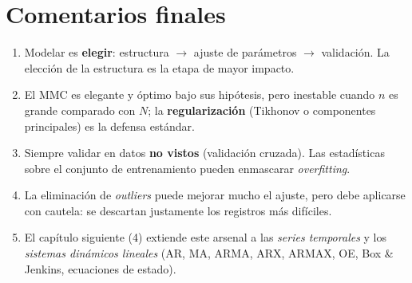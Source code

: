 \section{Comentarios finales}

\begin{enumerate}[leftmargin=1.2cm]
  \item Modelar es \textbf{elegir}: estructura $\rightarrow$ ajuste de
        parámetros $\rightarrow$ validación. La elección de la
        estructura es la etapa de mayor impacto.
  \item El MMC es elegante y óptimo bajo sus hipótesis, pero
        inestable cuando $n$ es grande comparado con $N$; la
        \textbf{regularización} (Tikhonov o componentes principales)
        es la defensa estándar.
  \item Siempre validar en datos \textbf{no vistos} (validación
        cruzada). Las estadísticas sobre el conjunto de entrenamiento
        pueden enmascarar \emph{overfitting}.
  \item La eliminación de \emph{outliers} puede mejorar mucho el
        ajuste, pero debe aplicarse con cautela: se descartan
        justamente los registros más difíciles.
  \item El capítulo siguiente (4) extiende este arsenal a las
        \emph{series temporales} y los \emph{sistemas dinámicos
        lineales} (AR, MA, ARMA, ARX, ARMAX, OE, Box \& Jenkins,
        ecuaciones de estado).
\end{enumerate}


